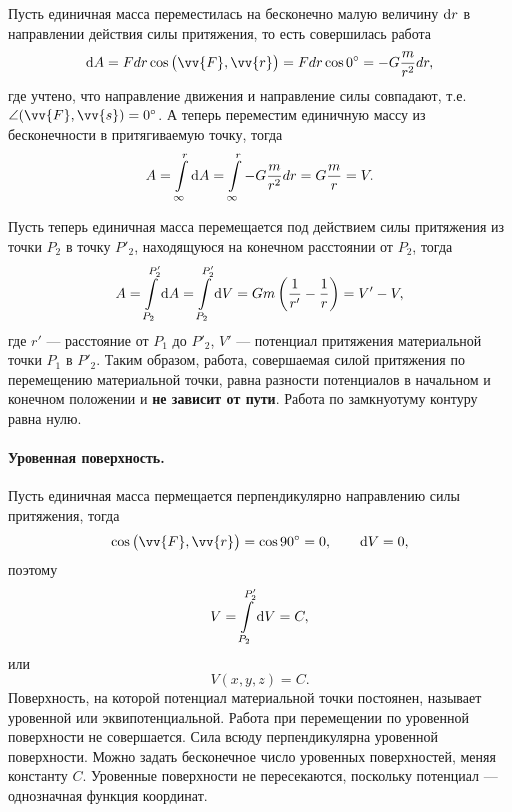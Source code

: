 \documentclass[11pt, a4paper]{article}
\theoremstyle{plain}
\theoremstyle{definition}
\theoremstyle{remark}
\begin{document}
Пусть единичная масса переместилась на бесконечно малую величину $\dif r$ в направлении действия силы
притяжения, то есть совершилась работа
\begin{equation*}
    \dif A = F dr \cos{\left( \vv{F}, \vv{r} \right)} =
    F dr \cos{0^\circ} = -G\dfrac{m}{r^2}dr,
\end{equation*}
где учтено, что направление движения и направление силы совпадают, т.е. $\angle (\vv{F},\vv{s}) =
0^\circ$. А теперь переместим единичную массу из бесконечности в притягиваемую точку, тогда
\begin{equation*}
    A = \int\limits_{\infty}^{r}\dif A = \int\limits_{\infty}^{r} -G\dfrac{m}{r^2}dr =
    G\dfrac{m}{r} = V.
\end{equation*}

Пусть теперь единичная масса перемещается под действием силы притяжения  из точки $P_2$ в точку $P'_2$,
находящуюся на конечном расстоянии от $P_2$, тогда
\begin{equation*}
    A = \int\limits_{P_2}^{P'_2}\dif A =  \int\limits_{P_2}^{P'_2}\dif V = Gm\left( \dfrac{1}{r'} - \dfrac{1}{r}\right) = 
    V' - V,
\end{equation*}
где $r'$ --- расстояние от $P_1$ до $P'_2$, $V'$ --- потенциал притяжения материальной точки $P_1$ в
$P'_2$.
Таким образом, работа, совершаемая силой притяжения по перемещению материальной точки, равна
разности потенциалов в начальном и конечном положении и \textbf{не зависит от пути}. Работа по
замкнуотуму контуру равна нулю.

\paragraph{Уровенная поверхность.}
Пусть единичная масса пермещается перпендикулярно направлению силы притяжения, тогда
\begin{equation*}
    \cos{\left( \vv{F}, \vv{r} \right)} = \cos{90^\circ} = 0, \qquad \dif V = 0,
\end{equation*}
поэтому 
\begin{equation*}
    V = \int\limits_{P_2}^{P'_2}\dif V = C, 
\end{equation*}
или
\begin{equation*}
    V \left( x, y, z \right) = C.
\end{equation*}
Поверхность, на которой потенциал материальной точки постоянен, называет уровенной или
эквипотенциальной. Работа при перемещении по уровенной поверхности не совершается.
Сила всюду перпендикулярна уровенной поверхности. Можно задать бесконечное число уровенных
поверхностей, меняя константу $C$. Уровенные поверхности не пересекаются, поскольку потенциал ---
однозначная функция координат.
\end{document}
